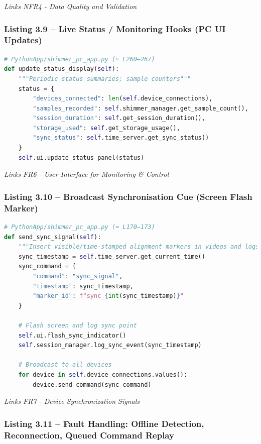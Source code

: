 \documentclass[12pt,a4paper]{article}
\begin{document}
\emph{Links NFR4 - Data Quality and Validation}

\subsubsection{Listing 3.9 -- Live Status / Monitoring Hooks (PC UI Updates)}\label{listing-3.9-live-status-monitoring-hooks-pc-ui-updates}

\begin{lstlisting}[language=Python]
# PythonApp/shimmer_pc_app.py (≈ L260–267)
def update_status_display(self):
    """Periodic status summaries; sample counters"""
    status = {
        "devices_connected": len(self.device_connections),
        "samples_recorded": self.shimmer_manager.get_sample_count(),
        "session_duration": self.get_session_duration(),
        "storage_used": self.get_storage_usage(),
        "sync_status": self.time_server.get_sync_status()
    }
    self.ui.update_status_panel(status)
\end{lstlisting}

\emph{Links FR6 - User Interface for Monitoring \& Control}

\subsubsection{Listing 3.10 -- Broadcast Synchronisation Cue (Screen Flash Marker)}\label{listing-3.10-broadcast-synchronisation-cue-screen-flash-marker}

\begin{lstlisting}[language=Python]
# PythonApp/shimmer_pc_app.py (≈ L170–173)
def send_sync_signal(self):
    """Insert visible/time-stamped alignment markers in videos and logs"""
    sync_timestamp = self.time_server.get_current_time()
    sync_command = {
        "command": "sync_signal",
        "timestamp": sync_timestamp,
        "marker_id": f"sync_{int(sync_timestamp)}"
    }
    
    # Flash screen and log sync point
    self.ui.flash_sync_indicator()
    self.session_manager.log_sync_event(sync_timestamp)
    
    # Broadcast to all devices
    for device in self.device_connections.values():
        device.send_command(sync_command)
\end{lstlisting}

\emph{Links FR7 - Device Synchronization Signals}

\subsubsection{Listing 3.11 -- Fault Handling: Offline Detection, Reconnection, Queued Command Replay}\label{listing-3.11-fault-handling-offline-detection-reconnection-queued-command-replay}
\end{document}
